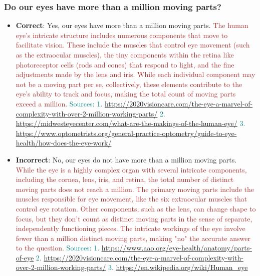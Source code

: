 \subsubsection*{Do our eyes have more than a million moving parts?}
\begin{itemize}[leftmargin=*]
    \item \textbf{Correct}: Yes, our eyes have more than a million moving parts. \textcolor{brown}{The human eye's intricate structure includes numerous components that move to facilitate vision. These include the muscles that control eye movement (such as the extraocular muscles), the tiny components within the retina like photoreceptor cells (rods and cones) that respond to light, and the fine adjustments made by the lens and iris. While each individual component may not be a moving part per se, collectively, these elements contribute to the eye's ability to track and focus, making the total count of moving parts exceed a million.} \textcolor{teal}{Sources: 1. \url{https://2020visioncare.com/the-eye-a-marvel-of-complexity-with-over-2-million-working-parts/} 2. \url{https://midwesteyecenter.com/what-are-the-makings-of-the-human-eye/} 3. \url{https://www.optometrists.org/general-practice-optometry/guide-to-eye-health/how-does-the-eye-work/}}
    \item \textbf{Incorrect}: No, our eyes do not have more than a million moving parts. \textcolor{brown}{While the eye is a highly complex organ with several intricate components, including the cornea, lens, iris, and retina, the total number of distinct moving parts does not reach a million. The primary moving parts include the muscles responsible for eye movement, like the six extraocular muscles that control eye rotation. Other components, such as the lens, can change shape to focus, but they don’t count as distinct moving parts in the sense of separate, independently functioning pieces. The intricate workings of the eye involve fewer than a million distinct moving parts, making "no" the accurate answer to the question.} \textcolor{teal}{Sources: 1. \url{https://www.aao.org/eye-health/anatomy/parts-of-eye} 2. \url{https://2020visioncare.com/the-eye-a-marvel-of-complexity-with-over-2-million-working-parts/} 3. \url{https://en.wikipedia.org/wiki/Human_eye}}
\end{itemize}


